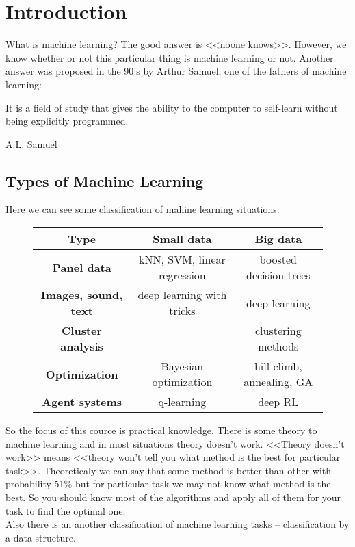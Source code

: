 \chapter{Introduction}

{\sf What is machine learning? The good answer is <<noone knows>>. However, we know whether or not this particular thing is machine learning or not. Another answer was proposed in the 90's by Arthur Samuel, one of the fathers of machine learning:
\begin{displayquote}
  \glqq It is a field of study that gives the ability to the computer to self-learn without being explicitly programmed.\grqq
  \begin{flushright}
  	A.L. Samuel
  \end{flushright}
\end{displayquote}
}

\section{Types of Machine Learning}

Here we can see some classification of mahine learning situations:
\begingroup
	\def\arraystretch{2}
	\begin{figure}[H]
		\centering
		\begin{tabular}{|c|c|c|} 
			\hline
			{\bf Type} & {\bf Small data} & {\bf Big data} \\
			\hline
			{\bf Panel data} & kNN, SVM, linear regression & boosted decision trees \\
 			\hline
 			{\bf Images, sound, text} & deep learning with tricks & deep learning \\
	 		\hline
	 		{\bf Cluster analysis} &  & clustering methods \\
	 		\hline
	 		{\bf Optimization} & Bayesian optimization & hill climb, annealing, GA\\
	 		\hline
	 		{\bf Agent systems} & q-learning & deep RL \\
 			\hline
		\end{tabular}
	\end{figure}
\endgroup
So the focus of this cource is practical knowledge. There is some theory to machine learning and in most situations theory doesn't work. <<Theory doesn't work>> means <<theory won't tell you what method is the best for particular task>>. Theoreticaly we can say that some method is better than other with probability 51\% but for particular task we may not know what method is the best. So you should know most of the algorithms and apply all of them for your task to find the optimal one.\\
Also there is an another classification of machine learning tasks -- classification by a data structure.

